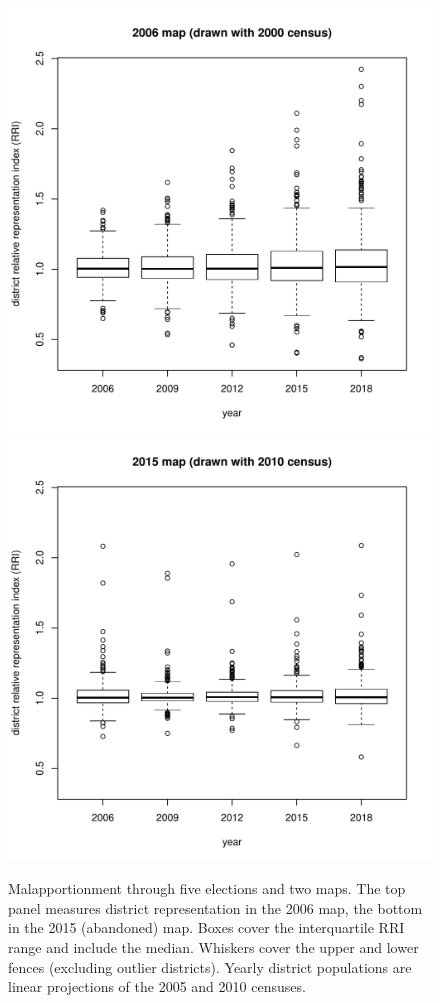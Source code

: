 \documentclass[letter,12pt]{article}
\begin{document}
\begin{figure}
\begin{center}
    \includegraphics[width=.65\columnwidth]{rris0618d0.pdf} \\ 
    \includegraphics[width=.65\columnwidth]{rris0618d3.pdf}  
  \caption{Malapportionment through five elections and two maps. The top panel measures district representation in the 2006 map, the bottom in the 2015 (abandoned) map. Boxes cover the interquartile RRI range and include the median. Whiskers cover the upper and lower fences (excluding outlier districts). Yearly district populations are linear projections of the 2005 and 2010 censuses.}\label{F:malapp}
\end{center}
\end{figure}
\end{document}
